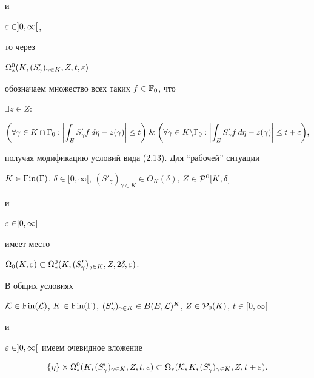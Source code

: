 и


$\varepsilon \in ]0,\infty[$,


то через


$\Omega^0_*(K, (S'_\gamma)_{\gamma \in K}, Z, t, \varepsilon)$


обозначаем множество всех таких $f \in {\Bbb F}_0$, что


$\exists z \in Z:$


%


$$


\biggl(\forall \gamma \in K \cap \Gamma_0: \biggl|\int_E S'_\gamma


f\,d\eta - z(\gamma)\biggr| \le t\biggr) \; \& \;


\biggl(\forall \gamma \in K


\backslash\Gamma_0:


\biggl|\int_E S'_\gamma f\,d\eta - z(\gamma)\biggr| \le t + \var\biggr),


$$


%


получая модификацию условий вида (2.13). Для ``рабочей'' ситуации


$K \in \Fin(\Gamma)$, $\delta \in [0, \infty[$, $(S'_\gamma)_{\gamma


\in K} \in O_K(\delta)$, $Z \in {\cal P}^0[K; \delta]$ 


и


$\varepsilon \in ]0,\infty[$ 


имеет место


$\Omega_0(K,\var) \subset \Omega^0_*(K,


(S'_\gamma)_{\gamma \in K}, Z, 2\delta, \var)$. 


В общих условиях


${\cal K} \in \Fin({\cal L})$, $K \in \Fin(\Gamma)$, $(S'_\gamma)_{\gamma


\in K} \in B \eL^K$, $Z \in {\cal P}_0(K)$, $t \in [0,\infty[$


и


$\varepsilon \in ]0,\infty[$ имеем очевидное вложение


%


\begin{equation}


\{\eta\} \times \Omega^0_*(K, (S'_\gamma)_{\gamma \in K}, Z, t,


\var) \subset


\Omega_*({\cal K}, K, (S'_\gamma)_{\gamma \in K}, Z, t + \var).


\end{equation}


